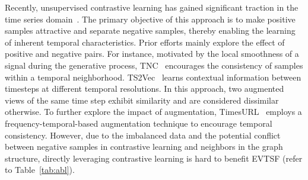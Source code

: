  Recently, unsupervised contrastive learning has gained significant traction in the time series domain~\cite{yue2022ts2vec, tonekaboni2021unsupervised, liu2024timesurl}. The primary objective of this approach is to make positive samples attractive and separate negative samples, thereby enabling the learning of inherent temporal characteristics. Prior efforts mainly explore the effect of positive and negative pairs. For instance, motivated by the local smoothness of a signal during the generative process, TNC~\cite{tonekaboni2021unsupervised} encourages the consistency of samples within a temporal neighborhood. TS2Vec~\cite{yue2022ts2vec} learns contextual information between timesteps at different temporal resolutions. In this approach, two augmented views of the same time step exhibit similarity and are considered dissimilar otherwise. To further explore the impact of augmentation, TimesURL~\cite{liu2024timesurl} employs a frequency-temporal-based augmentation technique to encourage temporal consistency. However, due to the imbalanced data and the potential conflict between negative samples in contrastive learning and neighbors in the graph structure, directly leveraging contrastive learning is hard to benefit EVTSF (refer to Table~\ref{tab:abl}).